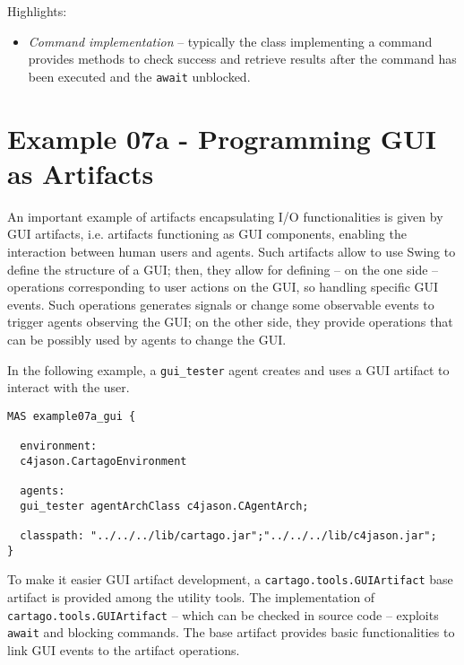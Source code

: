 \documentclass[11pt]{report}
\newcommand\code[1]{{\small{\mbox{\texttt{{#1}}}}}}
\newcommand{\cartago}{\mbox{\sf{CArtAgO}}}
\begin{document}
\noindent Highlights:
%
\begin{itemize}
%
\item \emph{Command implementation} -- typically the class implementing a command provides methods to check success and retrieve results  after the command has been executed and the \code{await} unblocked.
\end{itemize} 


\newpage
\section{Example 07a - Programming GUI as Artifacts}

An important example of artifacts encapsulating I/O functionalities is given by GUI artifacts, i.e. artifacts functioning as GUI components, enabling the interaction between human users and agents.
%
Such artifacts allow to use Swing to define the structure of a GUI;
%
then, they allow for defining -- on the one side -- operations corresponding to user actions on the GUI, so handling specific GUI events. Such operations generates signals or change some observable events to trigger agents observing the GUI;
%
on the other side, they provide operations that can be possibly used by agents to change the GUI.
%
\medskip

\noindent In the following example, a \code{gui\_tester} agent creates and uses a GUI artifact to interact with the user.
%
{\small{
\begin{verbatim}
MAS example07a_gui {

  environment: 
  c4jason.CartagoEnvironment

  agents:
  gui_tester agentArchClass c4jason.CAgentArch;

  classpath: "../../../lib/cartago.jar";"../../../lib/c4jason.jar";    
}
\end{verbatim}}}

To make it easier GUI artifact development, a \code{cartago.tools.GUIArtifact} base artifact is provided among the {\cartago} utility tools.
% 
The implementation of  \code{cartago.tools.GUIArtifact} -- which can be checked in {\cartago} source code -- exploits \code{await} and blocking commands.
%
The base artifact provides basic functionalities to link GUI events to the artifact operations.
\end{document}
